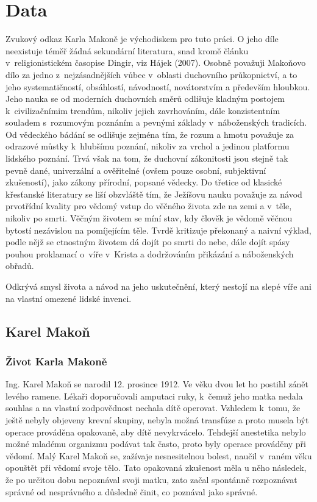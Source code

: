 \chapter{Data}
\label{kap:data}

Zvukový odkaz Karla Makoně je východiskem pro tuto práci. O jeho
díle neexistuje téměř žádná sekundární literatura, snad kromě článku
v~religionistickém časopise Dingir, viz Hájek (2007)\cite{hajek2007cesky}. Osobně
považuji Makoňovo dílo za jedno z~nejzásadnějších vůbec v~oblasti duchovního
průkopnictví, a to jeho systematičností, obsáhlostí, návodností, novátorstvím a
především hloubkou. Jeho nauka se od moderních duchovních směrů odlišuje kladným
postojem k~civilizačnímim trendům, nikoliv jejich zavrhováním, dále
konzistentním souladem s~rozumovým poznáním a pevnými základy v~náboženských
tradicích. Od vědeckého bádání se odlišuje zejména tím, že rozum a hmotu
považuje za odrazové můstky k~hlubšímu poznání, nikoliv za vrchol a jedinou
platformu lidského poznání. Trvá však na tom, že duchovní zákonitosti jsou
stejně tak pevně dané, univerzální a ověřitelné (ovšem pouze osobní, subjektivní
zkušeností), jako zákony přírodní, popsané vědecky. Do třetice od klasické
křesťanské literatury se liší obzvláště tím, že Ježíšovu nauku považuje za návod
prvotřídní kvality pro vědomý vstup do věčného života zde na zemi a v~těle,
nikoliv po smrti. Věčným životem se míní stav, kdy člověk je vědomě věčnou
bytostí nezávislou na pomíjejícím těle. Tvrdě kritizuje překonaný a naivní
výklad, podle nějž se ctnostným životem dá dojít po smrti do nebe, dále dojít
spásy pouhou proklamací o~víře v~Krista a dodržováním přikázání a náboženských
obřadů.

Odkrývá smysl života a návod na jeho uskutečnění, který nestojí na slepé víře
ani na vlastní omezené lidské invenci.

\section{Karel Makoň}

\subsection{Život Karla Makoně}

Ing. Karel Makoň se narodil 12. prosince 1912. Ve věku dvou let ho postihl zánět
levého ramene. Lékaři doporučovali amputaci ruky, k~čemuž jeho matka nedala
souhlas a na vlastní zodpovědnost nechala dítě operovat. Vzhledem k~tomu, že
ještě nebyly objeveny krevní skupiny, nebyla možná transfúze a proto musela být
operace prováděna opakovaně, aby dítě nevykrvácelo. Tehdejší anestetika nebylo
možné mladému organizmu podávat tak často, proto byly operace prováděny při
vědomí. Malý Karel Makoň se, zažívaje nesnesitelnou bolest, naučil v~raném věku
opouštět při vědomí svoje tělo. Tato opakovaná zkušenost měla u něho následek, že po
určitou dobu nepoznával svoji matku, zato začal spontánně rozpoznávat správné od
nesprávného a důsledně činit, co poznával jako správné.

